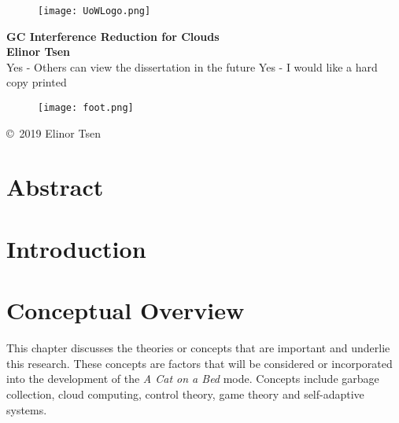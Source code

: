 \documentclass[12pt]{article}
\begin{document}
\clearpage\thispagestyle{empty}

\begin{center}

\begin{figure}[ht]
\texttt{[image: UoWLogo.png]}
\end{figure}

\vspace{40pt}

\Huge{\textbf{GC Interference Reduction for Clouds}}\\

\vspace{60pt}
\Large{\textbf{Elinor Tsen}}\\
Yes - Others can view the dissertation in the future
\newline\newline
Yes - I would like a hard copy printed 


\vspace{150pt}
\begin{figure}[h]
\texttt{[image: foot.png]}
\end{figure}

\vspace{10pt}
\copyright{~2019 Elinor Tsen}\\
\end{center}


\newpage
{}
\section*{Abstract}

\small
\newpage

\tableofcontents
\newpage
\listoffigures
\newpage
\listoftables
\newpage

\newpage
{}

\section{Introduction}

\newpage
\section{Conceptual Overview}
This chapter discusses the theories or concepts that are important and underlie this research. These concepts are factors that will be considered or incorporated into the development of the \emph{A Cat on a Bed} mode. Concepts include garbage collection, cloud computing, control theory, game theory and self-adaptive systems. 
\end{document}
